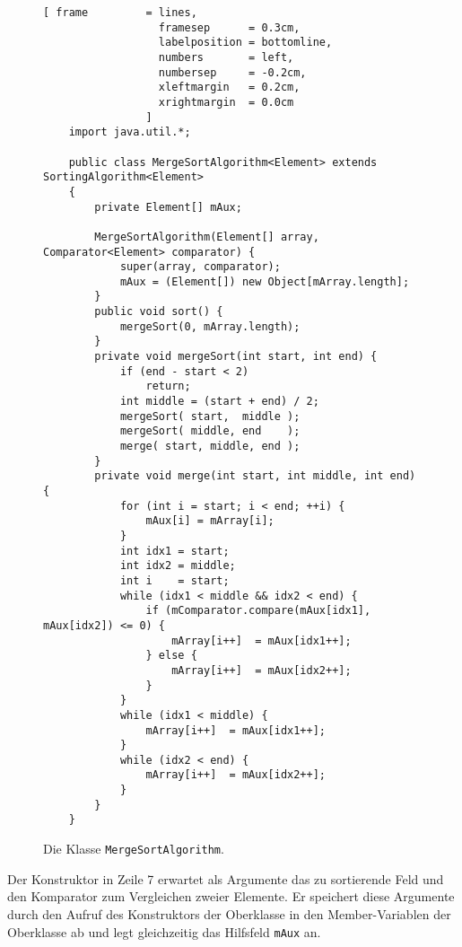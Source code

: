 \begin{figure}[!ht]
  \centering
\begin{Verbatim}[ frame         = lines, 
                  framesep      = 0.3cm, 
                  labelposition = bottomline,
                  numbers       = left,
                  numbersep     = -0.2cm,
                  xleftmargin   = 0.2cm,
                  xrightmargin  = 0.0cm
                ]
    import java.util.*;
    
    public class MergeSortAlgorithm<Element> extends SortingAlgorithm<Element>
    {
        private Element[] mAux;        
        
        MergeSortAlgorithm(Element[] array, Comparator<Element> comparator) {
            super(array, comparator);
            mAux = (Element[]) new Object[mArray.length];
        }
        public void sort() {
            mergeSort(0, mArray.length);        
        }
        private void mergeSort(int start, int end) {
            if (end - start < 2)
                return;
            int middle = (start + end) / 2;                         
            mergeSort( start,  middle );  
            mergeSort( middle, end    );    
            merge( start, middle, end ); 
        }
        private void merge(int start, int middle, int end) {    
            for (int i = start; i < end; ++i) {
                mAux[i] = mArray[i]; 
            }
            int idx1 = start;
            int idx2 = middle;
            int i    = start;
            while (idx1 < middle && idx2 < end) {
                if (mComparator.compare(mAux[idx1], mAux[idx2]) <= 0) {
                    mArray[i++]  = mAux[idx1++]; 
                } else {
                    mArray[i++]  = mAux[idx2++]; 
                }
            }
            while (idx1 < middle) {
                mArray[i++]  = mAux[idx1++];
            }
            while (idx2 < end) {
                mArray[i++]  = mAux[idx2++];  
            }
        }
    }
\end{Verbatim}
\vspace*{-0.3cm}
  \caption{Die Klasse \texttt{MergeSortAlgorithm}.}
  \label{fig:MergeSortAlgorithm.java}
\end{figure}
Der Konstruktor in Zeile 7 erwartet als Argumente das zu sortierende Feld und den
Komparator zum Vergleichen zweier Elemente.  Er speichert diese Argumente 
durch den Aufruf des Konstruktors der Oberklasse in den
Member-Variablen der Oberklasse ab und legt gleichzeitig das Hilfsfeld \texttt{mAux} an.

